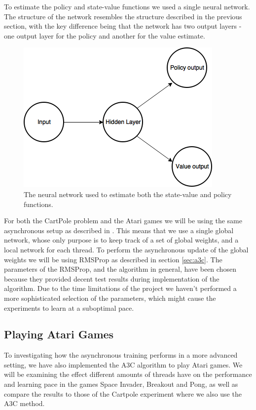 \documentclass[11pt]{article}
\begin{document}
To estimate the policy and state-value functions we used a single
neural network.
The structure of the network resembles the structure described in the previous section, 
with the key difference being that the network has two output layers -
one output layer for the policy and another for the value estimate.

\begin{figure}[H]
    \centering
    \includegraphics[scale=0.5]{include/shared_cartpole.png}
    \caption{The neural network used to estimate both the state-value
             and policy functions.}
    \label{fig:s_cartpole}
\end{figure}

For both the CartPole problem and the Atari games we will be using the same asynchronous setup
as described in \cite{a3c}.
This means that we use a single global network, whose only
purpose is to keep track of a set of global weights, and a local network
for each thread.
To perform the asynchronous update of the global weights we will be using
RMSProp as described in section \ref{sec:a3c}.
The parameters of the RMSProp, and the algorithm in general, have
been chosen because they provided decent test results during implementation
of the algorithm.
Due to the time limitations of the project we haven't performed
a more sophisticated selection of the parameters, which might
cause the experiments to learn at a suboptimal pace.

\subsection{Playing Atari Games}

To investigating how the asynchronous training performs in
a more advanced setting, we have also implemented the A3C algorithm
to play Atari games.
We will be examining the effect different amounts of threads
have on the performance and learning pace in the games Space Invader, Breakout
and Pong, as well as compare the results to those of the Cartpole experiment
where we also use the A3C method.
\end{document}

